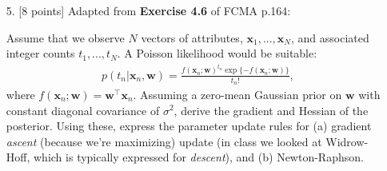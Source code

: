 \documentclass[10pt]{article}
\begin{document}
\begin{itemize}
{\bf Solution.} %
My method estimate the value of pi by calculating the number of points fall in the circle and the total number of points. Since the area of a square is $r^2$ and the area of a circle is $\pi r^2$, the ratio of the two would be $\pi/4$. Therefore, the estimated value of $\pi$ is $4 \times the\,number\,of\,points\,in\,the\,circle$ over $the\,number\,of\,total\,points$.



\item[5.]  [8 points]
Adapted from {\bf Exercise 4.6} of FCMA p.164:

Assume that we observe $N$ vectors of attributes, $\mathbf{x}_1, ..., \mathbf{x}_N$, and associated integer counts $t_1, ..., t_N$.  A Poisson likelihood would be suitable:
\begin{eqnarray*}
p(t_n | \mathbf{x}_n, \mathbf{w}) = \frac{f(\mathbf{x}_n; \mathbf{w})^{t_n} \exp \{ -f(\mathbf{x}_n; \mathbf{w}) \}}{t_n!},
\end{eqnarray*}
where $f(\mathbf{x}_n;\mathbf{w}) = \mathbf{w}^\top\mathbf{x}_n$.
Assuming a zero-mean Gaussian prior on $\mathbf{w}$ with constant diagonal covariance of $\sigma^2$, derive the gradient and Hessian of the posterior.  Using these, express the parameter update rules for (a) gradient {\em ascent} (because we're maximizing) update (in class we looked at Widrow-Hoff, which is typically expressed for {\em descent}), and (b) Newton-Raphson.


\end{itemize}
\end{document}
